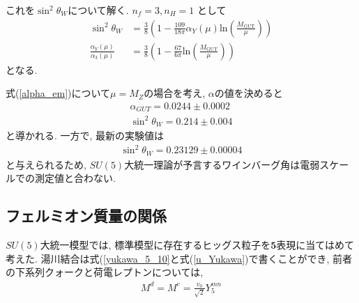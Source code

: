 これを$\sin^2\theta_W$について解く.
$n_f =3, n_H = 1$ として
\begin{align}
  \sin^2{\theta_W} &= \frac{3}{8}\left( 1 - \frac{109}{18\pi}\alpha_{Y}(\mu)\mathrm{ln}\left(\frac{M_{\mathrm{GUT}}}{\mu}\right) \right)\nonumber\\
  \frac{\alpha_{Y}{(\mu)}}{\alpha_{3}{(\mu)}} &= \frac{3}{8}\left( 1 - \frac{67}{6\pi} \mathrm{ln}\left(\frac{M_{\mathrm{GUT}}}{\mu}\right)\right)\label{alpha_em}
\end{align}
となる.

式(\ref{alpha_em})について$\mu=M_Z$の場合を考え, $\alpha$の値を決めると
\begin{align}
  \alpha_{GUT} = 0.0244\pm 0.0002\nonumber\\
  \sin^2 \theta_W = 0.214\pm 0.004\nonumber
\end{align}
と導かれる. \cite{}
一方で, 最新の実験値は
\begin{align}
  \sin^2\theta_W = 0.23129\pm0.00004
\end{align}
と与えられるため, $SU(5)$大統一理論が予言するワインバーグ角は電弱スケールでの測定値と合わない.

\subsection{フェルミオン質量の関係}
$SU(5)$大統一模型では, 標準模型に存在するヒッグス粒子を$\bm{5}$表現に当てはめて考えた.
湯川結合は式(\ref{yukawa_5_10}と式(\ref{u_Yukawa})で書くことができ, 前者の下系列クォークと荷電レプトンについては, 
\begin{align}
  M^d = M^e = \frac{v_0}{\sqrt{2}}Y_5^{mn}
\end{align}


